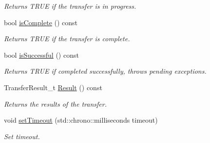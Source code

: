 \begin{DoxyCompactItemize}
\begin{DoxyCompactList}\small\item\em Returns T\-R\-U\-E if the transfer is in progress. \end{DoxyCompactList}\item 
\hypertarget{class_lib_u_s_b_1_1_transfer_impl_a40ba91ea27ed8132860febec9e66df80}{bool \hyperlink{class_lib_u_s_b_1_1_transfer_impl_a40ba91ea27ed8132860febec9e66df80}{is\-Complete} () const }\label{class_lib_u_s_b_1_1_transfer_impl_a40ba91ea27ed8132860febec9e66df80}

\begin{DoxyCompactList}\small\item\em Returns T\-R\-U\-E if the transfer is complete. \end{DoxyCompactList}\item 
\hypertarget{class_lib_u_s_b_1_1_transfer_impl_af6a428e676c3193d85cb23b2dc088de5}{bool \hyperlink{class_lib_u_s_b_1_1_transfer_impl_af6a428e676c3193d85cb23b2dc088de5}{is\-Successful} () const }\label{class_lib_u_s_b_1_1_transfer_impl_af6a428e676c3193d85cb23b2dc088de5}

\begin{DoxyCompactList}\small\item\em Returns T\-R\-U\-E if completed successfully, throws pending exceptions. \end{DoxyCompactList}\item 
\hypertarget{class_lib_u_s_b_1_1_transfer_impl_a5313634c35953104525d6029fcc4971b}{Transfer\-Result\-\_\-t \hyperlink{class_lib_u_s_b_1_1_transfer_impl_a5313634c35953104525d6029fcc4971b}{Result} () const }\label{class_lib_u_s_b_1_1_transfer_impl_a5313634c35953104525d6029fcc4971b}

\begin{DoxyCompactList}\small\item\em Returns the results of the transfer. \end{DoxyCompactList}\item 
\hypertarget{class_lib_u_s_b_1_1_transfer_impl_aff9a9c6c22b8732de51860a630b92f1a}{void \hyperlink{class_lib_u_s_b_1_1_transfer_impl_aff9a9c6c22b8732de51860a630b92f1a}{set\-Timeout} (std\-::chrono\-::milliseconds timeout)}\label{class_lib_u_s_b_1_1_transfer_impl_aff9a9c6c22b8732de51860a630b92f1a}

\begin{DoxyCompactList}\small\item\em Set timeout. \end{DoxyCompactList}\end{DoxyCompactItemize}
